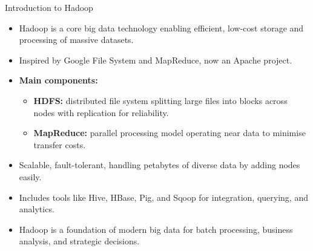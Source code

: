 \documentclass[aspectratio=169, table]{beamer}
\begin{document}
\begin{frame}{Introduction to Hadoop}
	\vspace{10pt}
	
	\begin{itemize}
		\item Hadoop is a core big data technology enabling efficient, low-cost storage and processing of massive datasets.
		
		\item Inspired by Google File System and MapReduce, now an Apache project.
		
		\item \textbf{Main components:}
		\begin{itemize}
			\item \textbf{HDFS:} distributed file system splitting large files into blocks across nodes with replication for reliability.
			\item \textbf{MapReduce:} parallel processing model operating near data to minimise transfer costs.
		\end{itemize}
		
		\item Scalable, fault-tolerant, handling petabytes of diverse data by adding nodes easily.
		
		\item Includes tools like Hive, HBase, Pig, and Sqoop for integration, querying, and analytics.
		
		\item Hadoop is a foundation of modern big data for batch processing, business analysis, and strategic decisions.
	\end{itemize}
	
\end{frame}
\end{document}
